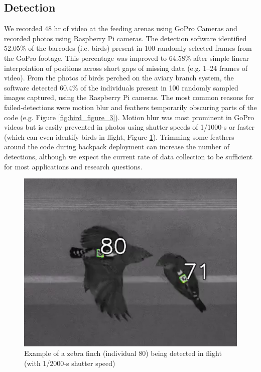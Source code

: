 \documentclass[11pt,a4paper,twoside]{book}
\begin{document}
\begin{doublespace}
\subsection{Detection}
We recorded 48 hr of video at the feeding arenas using GoPro Cameras and recorded photos using Raspberry Pi cameras. The detection software identified 52.05\% of the barcodes (i.e. birds) present in 100 randomly selected frames from the GoPro footage. This percentage was improved to 64.58\% after simple linear interpolation of positions across short gaps of missing data (e.g. 1–24 frames of video). From the photos of birds perched on the aviary branch system, the software detected 60.4\% of the individuals present in 100 randomly sampled images captured, using the Raspberry Pi cameras. The most common reasons for failed‐detections were motion blur and feathers temporarily obscuring parts of the code (e.g. Figure \ref{fig:bird_figure_3}). Motion blur was most prominent in GoPro videos but is easily prevented in photos using shutter speeds of 1/1000‐s or faster (which can even identify birds in flight, Figure \ref{fig:bird_figure_6}). Trimming some feathers around the code during backpack deployment can increase the number of detections, although we expect the current rate of data collection to be sufficient for most applications and research questions.

\begin{figure}[!htb]
    \centering
    \includegraphics{Graving_IMPRS_Thesis/figures/bird_figure_6.jpg}
    \caption{Example of a zebra finch (individual 80) being detected in flight (with 1/2000‐s shutter speed)
}
    \label{fig:bird_figure_6}
\end{figure}

\end{doublespace}
\end{document}
